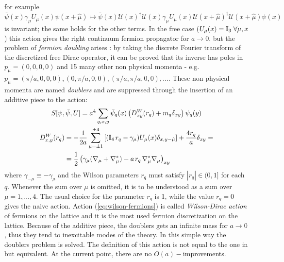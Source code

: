 \documentclass[english, LaM, oneside, noexaminfo]{sapthesis}
\begin{document}
for example $\bar \psi (x) \gamma_\mu U_\mu (x) \psi (x + \hat \mu) \mapsto \bar\psi (x) \mathcal{U}(x)^\dagger \mathcal{U} (x) \gamma_\mu U_\mu (x) \mathcal{U} (x+\hat\mu)^\dagger \mathcal{U}(x+\hat\mu) \psi (x)$ is invariant;
the same holds for the other terms.
\newline
In the free case ($U_\mu (x) = \mathbb{I}_3 \hspace*{1mm} \forall \mu ,x$) this action gives the right continuum fermion propagator for $a\rightarrow 0$, but the problem of \textit{fermion doubling} arises \cite{montvay-munster}:
by taking the discrete Fourier transform of the discretized free Dirac operator, it can be proved that its inverse has poles in $p_\mu = (0,0,0,0)$ and 15 many other non physical momenta - e.g. $p_\mu = (\pi/a,0,0,0), (0,\pi/a,0,0), (\pi/a,\pi/a,0,0),\dots$.
These non physical momenta are named \textit{doublers} and are suppressed through the insertion of an additive piece to the action:
\begin{equation}\label{eq:wilson-fermions}
    \begin{gathered}
        S[\psi,\bar \psi, U] = a^4\sum_{q,x,y} \bar \psi_q (x) \left( D^W_{xy}(r_q) + m_q \delta_{xy}  \right) \psi_q (y) \\
        \begin{aligned}
            D_{x,y}^W (r_q)
            & = -\frac{1}{2a}\sum_{\mu = \pm 1}^{\pm 4} \left[ (\mathbb{I}_4 \hspace*{0.5mm} r_q - \gamma_\mu)U_\mu (x) \delta_{x,y-\hat \mu} \right] + \frac{4r_q}{a}\delta_{xy} = \\
            & = \frac{1}{2}\left(\gamma_\mu(\nabla_\mu +\nabla_\mu^*) - a\hspace*{0.5mm}r_q\hspace*{0.5mm}\nabla_\mu^*\nabla_\mu\right)_{xy}
        \end{aligned}
    \end{gathered}
\end{equation}
where $\gamma_{-\mu} \equiv -\gamma_\mu$ and the Wilson parameters $r_q$ must satisfy $|r_q|\in(0,1]$ for each $q$.
Whenever the sum over $\mu$ is omitted, it is to be understood as a sum over $\mu = 1, \dots, 4$.
The usual choice for the parameter $r_q$ is 1, while the value $r_q = 0$ gives the naive action.
Action (\ref{eq:wilson-fermions}) is called \textit{Wilson-Dirac action} of fermions on the lattice and it is the most used fermion discretization on the lattice.
Because of the additive piece, the doublers gets an infinite mass for $a \rightarrow 0$, thus they tend to inexcitable modes of the theory.
In this simple way the doublers problem is solved.
The definition of this action is not equal to the one in \cite{montvay-munster}\cite{gattringer-lang} but equivalent.
At the current point, there are no $O(a)-$improvements.
\end{document}
